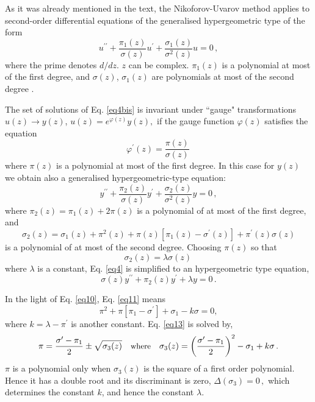 \documentclass[preprint,showpacs,preprintnumbers,amsmath,amssymb,nofootinbib]{revtex4}
\def\where{{\quad\text{\small where}\quad}}
\begin{document}
As it was already mentioned in the text, the Nikoforov-Uvarov method applies to second-order differential equations of the generalised hypergeometric type of the form
\begin{equation}
u^{\prime\prime}+\frac{\pi_1(z)}{\sigma(z)}u^\prime+\frac{\sigma_1(z)}{\sigma^2(z)}u=0\,,
\label{eq4bis} 
\end{equation}
where the prime denotes $d/dz$. $z$ can be complex. $\pi_1(z)$ is a  polynomial at most of the first degree, and $\sigma(z)$, $\sigma_1(z)$ are polynomials at most of the second degree \cite{NikiUvar}. 

The set of solutions of Eq. \eqref{eq4bis} is invariant under  ``gauge" transformations $u(z) \to y(z)$,
$ 
u(z)=e^{\varphi(z)}y(z),    
$ 
if the gauge function $\varphi(z)$ satisfies the equation
\begin{equation}
\varphi^\prime(z) =\frac{\pi(z)}{\sigma(z)}\,
\label{eq7}
\end{equation}
where $\pi(z)$ is a polynomial at most of the first degree. In this case for $y(z)$ 
we obtain also a generalised hypergeometric-type equation:
\begin{equation}
y^{\prime\prime}+\frac{\pi_2(z)}{\sigma(z)}y^\prime+\frac{\sigma_2(z)}{\sigma^2(z)}y=0\,,
\label{eq8}    
\end{equation}
where
$
\pi_2(z)=\pi_1(z)+2\pi(z)
$ 
is a polynomial  of at most of the first degree, and
\begin{equation}
\sigma_2(z)=\sigma_1(z)+\pi^2(z)+\pi(z)\left [\pi_1(z)-\sigma^\prime(z)\right]+\pi^\prime(z)\sigma(z)
\label{eq10}
\end{equation}
is a polynomial of at most of the second degree. 
Choosing  $\pi(z)$ so that
\begin{equation}
\sigma_2(z)=\lambda\sigma(z)\,   
\label{eq11}
\end{equation}
where $\lambda$ is a constant, Eq. \eqref{eq4} is simplified to an hypergeometric type equation,
\begin{equation}
\sigma(z)y^{\prime\prime}+\pi_2(z)y^\prime+\lambda y=0\,.
\label{eq12}
\end{equation}

In the light of Eq. \eqref{eq10}, Eq. \eqref{eq11} means
\begin{equation}
 \pi^2+\pi[\pi_1-\sigma^\prime]+\sigma_1-k\sigma=0,
 \label{eq13}
\end{equation}
where
$
k=\lambda-\pi^\prime
$ 
is another constant.
Eq. \eqref{eq13} is  solved by,
\begin{equation}
\pi=\frac{\sigma^\prime-\pi_1}{2}\pm\sqrt{\sigma_3(z)}
\where
\sigma_3(z)=\left(\frac{\sigma^\prime-\pi_1}{2}\right)^2-\sigma_1+k\sigma\,.
\label{eq15}
\end{equation}
$\pi$ is a polynomial only when
$\sigma_3(z)$ is the square of a first order polynomial. Hence it has a double root and its discriminant is zero,
$
\Delta(\sigma_3)=0\,,
$
which determines the constant $k$, and hence 
the constant $\lambda$.
\end{document}
